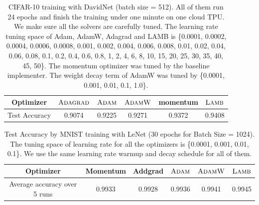 \begin{table}[ht]
\renewcommand{\arraystretch}{1.3}
\caption{ CIFAR-10 training with DavidNet (batch size = 512). All of them run 24 epochs and finish the training under one minute on one cloud TPU. We make sure all the solvers are carefully tuned. The learning rate tuning space of Adam, AdamW, Adagrad and LAMB is \{0.0001, 0.0002, 0.0004, 0.0006, 0.0008, 0.001, 0.002, 0.004, 0.006, 0.008, 0.01, 0.02, 0.04, 0.06, 0.08, 0.1, 0.2, 0.4, 0.6, 0.8, 1, 2, 4, 6, 8, 10, 15, 20, 25, 30, 35, 40, 45, 50\}. The momentum optimizer was tuned by the baseline implementer. The weight decay term of AdamW was tuned by \{0.0001, 0.001, 0.01, 0.1, 1.0\}.}
\centering
\begin{tabular}{|c|c|c|c|c|c|}
\hline
Optimizer & $\textsc{Adagrad}$ & $\textsc{Adam}$ & $\textsc{AdamW}$ & momentum & $\textsc{Lamb}$ \\
\hline
\hline
Test Accuracy & 0.9074 & 0.9225 & 0.9271 & 0.9372 & 0.9408 \\
\hline
\end{tabular}
\label{table:cifar10_davidnet}
\end{table}



\begin{table}[ht]
\renewcommand{\arraystretch}{1.3}
\caption{ Test Accuracy by MNIST training with LeNet (30 epochs for Batch Size = 1024). The tuning space of learning rate for all the optimizers is \{0.0001, 0.001, 0.01, 0.1\}. We use the same learning rate warmup and decay schedule for all of them.}
\centering
\begin{tabular}{|c|c|c|c|c|c|}
\hline
Optimizer & Momentum & Addgrad & $\textsc{Adam}$ & $\textsc{AdamW}$ & $\textsc{Lamb}$ \\
\hline
\hline
Average accuracy over 5 runs & 0.9933  & 0.9928 & 0.9936 & 0.9941 & 0.9945  \\
\hline
\end{tabular}
\label{table:mnist_results}
\end{table}

